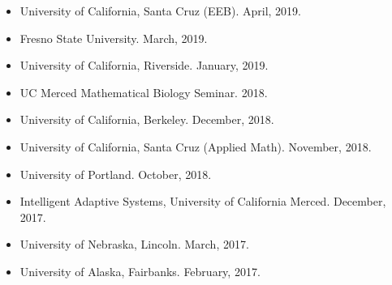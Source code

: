 \documentclass[margin,line,12pt]{res}
\begin{document}
\begin{resume}
\begin{itemize}
\item University of California, Santa Cruz (EEB). April, 2019.

\item Fresno State University. March, 2019.

\item University of California, Riverside. January, 2019.

\item UC Merced Mathematical Biology Seminar. 2018.

\item University of California, Berkeley. December, 2018.

\item University of California, Santa Cruz (Applied Math). November, 2018.

\item University of Portland. October, 2018.

\item Intelligent Adaptive Systems, University of California Merced. December, 2017.

\item University of Nebraska, Lincoln. March, 2017.

\item University of Alaska, Fairbanks. February, 2017.


\end{itemize}
\end{resume}
\end{document}
